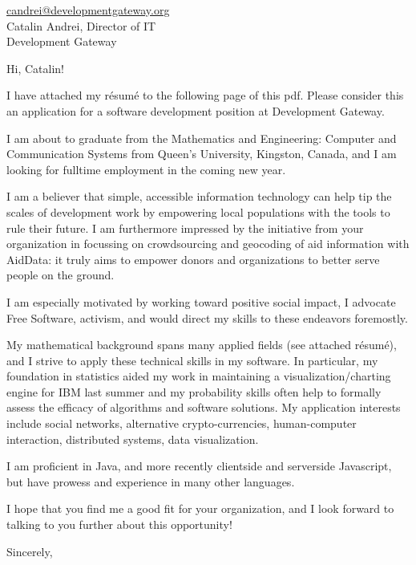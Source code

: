\documentclass[10pt]{letter}
\begin{document}
	\begin{letter}{\href{mailto:candrei@developmentgateway.org}{candrei@developmentgateway.org} \\Catalin Andrei, Director of IT \\ Development Gateway}
		\opening{Hi, Catalin!}
		I have attached my résumé to the following page of this pdf. Please consider this an application for a software development position at Development Gateway.

		I am about to graduate from the Mathematics and Engineering: Computer and Communication Systems from Queen's University, Kingston, Canada, and I am looking for fulltime employment in the coming new year.

		I am a believer that simple, accessible information technology can help tip the scales of development work by empowering local populations with the tools to rule their future. I am furthermore impressed by the initiative from your organization in focussing on crowdsourcing and geocoding of aid information with AidData: it truly aims to empower donors and organizations to better serve people on the ground.

		I am especially motivated by working toward positive social impact, I advocate Free Software, activism, and would direct my skills to these endeavors foremostly.

		My mathematical background spans many applied fields (see attached résumé), and I strive to apply these technical skills in my software. In particular, my foundation in statistics aided my work in maintaining a visualization/charting engine for IBM last summer and my probability skills often help to formally assess the efficacy of algorithms and software solutions. My application interests include social networks, alternative crypto-currencies, human-computer interaction, distributed systems, data visualization.

		I am proficient in Java, and more recently clientside and serverside Javascript, but have prowess and experience in many other languages. 

		I hope that you find me a good fit for your organization, and I look forward to talking to you further about this opportunity!

		\closing{Sincerely,}
	\end{letter}
\end{document}
